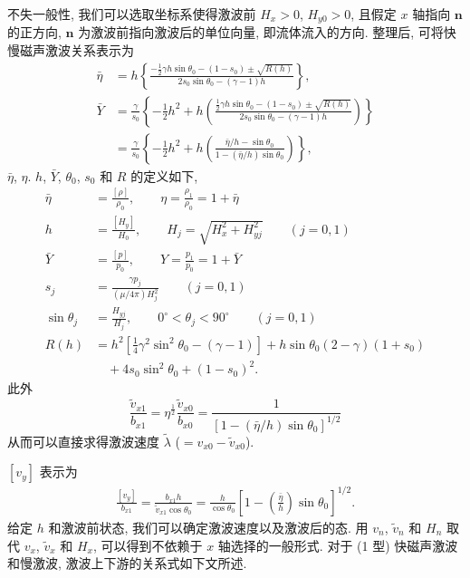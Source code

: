 \documentclass{article}
\begin{document}
不失一般性, 我们可以选取坐标系使得激波前 $H_x > 0$, $H_{y0} > 0$, 且假定 $x$ 轴指向 $\boldsymbol{n}$ 的正方向, $\boldsymbol{n}$ 为激波前指向激波后的单位向量,
即流体流入的方向. 整理后, 可将快慢磁声激波关系表示为
\begin{align}
\bar{\eta} &= h\left\{\frac{-\frac{1}{2}\gamma h \sin\theta_0 -
(1-s_0) \pm
\sqrt{R(h)}}{2 s_0 \sin\theta_0 - (\gamma-1) h}\right\},\label{Eqn:6.2.15}
\\
\bar{Y} &= \frac{\gamma}{s_0} \left\{-\frac{1}{2} h^2 +
h\left(\frac{\frac{1}{2}\gamma h \sin\theta_0 - (1-s_0) \pm
\sqrt{R(h)}}{2 s_0 \sin\theta_0 - (\gamma-1) h}\right)\right\}\label{Eqn:6.2.16a}
\\
&= \frac{\gamma}{s_0} \left\{-\frac{1}{2} h^2 +
h\left(\frac{\bar{\eta}/h - \sin\theta_0}{1 - (\bar{\eta}/h)
\sin\theta_0}\right)\right\},\label{Eqn:6.2.16b}
\end{align}
$\bar{\eta}$, $\eta$. $h$, $\bar{Y}$, $\theta_0$, $s_0$ 和 $R$ 的定义如下,
\begin{align}
\bar{\eta} &= \frac{[\rho]}{\rho_0}, \qquad \eta = \frac{\rho_1}{\rho_0} = 1 + \bar{\eta} \nonumber\\
h &= \frac{[H_y]}{H_0}, \qquad H_j = \sqrt{H_x^2+H_{yj}^2} \qquad (j=0,1) \nonumber\\
\bar{Y} &= \frac{[p]}{p_0}, \qquad Y = \frac{p_1}{p_0} = 1 + \bar{Y} \nonumber\\
s_j &= \frac{\gamma p_j}{(\mu/4\pi)H_j^2} \qquad (j=0,1) \nonumber\\
\sin\theta_j &= \frac{H_{yj}}{H_j}, \qquad 0^\circ < \theta_j < 90^\circ \qquad (j=0,1) \nonumber\\
R(h) &= h^2[\frac{1}{4} \gamma^2 \sin^2\theta_0 - (\gamma-1)] + h\sin\theta_0
(2-\gamma)(1+s_0)
\nonumber\\
& \quad + 4s_0 \sin^2\theta_0 + (1-s_0)^2.\label{Eqn:6.2.17}
\end{align}
此外
\begin{equation}
\frac{\tilde{v}_{x1}}{b_{x1}} = \eta^{\frac{1}{2}} \frac{\tilde{v}_{x0}}{b_{x0}} =
\frac{1}{[1-(\bar{\eta}/h) \sin\theta_0]^{1/2}}
\end{equation}
从而可以直接求得激波速度 $\tilde{\lambda}$ ($=v_{x0}-\tilde{v}_{x0}$).

$[v_y]$ 表示为
\begin{align}\label{Eqn:6.2.18a}
\frac{[v_y]}{b_{x1}} = \frac{b_{x1} h}{\tilde{v}_{x1} \cos\theta_0} =
\frac{h}{\cos\theta_0} \left[1 - \left(\frac{\bar{\eta}}{h}\right)
\sin\theta_0\right]^{1/2}.
\end{align}
给定 $h$ 和激波前状态, 我们可以确定激波速度以及激波后的态. 用 $v_n$, $\tilde{v}_n$ 和 $H_n$ 取代 $v_x$, $\tilde v_x$ 和 $H_x$,
可以得到不依赖于 $x$ 轴选择的一般形式. 对于 (1 型) 快磁声激波和慢激波, 激波上下游的关系式如下文所述.
\end{document}
